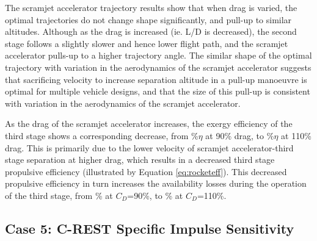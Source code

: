 The scramjet accelerator trajectory results show that when drag is varied, the optimal trajectories do not change shape significantly, and pull-up to similar altitudes. Although as the drag is increased (ie. L/D is decreased), the second stage follows a slightly slower and hence lower flight path, and the scramjet accelerator pulls-up to a higher trajectory angle. The similar shape of the optimal trajectory with variation in the aerodynamics of the scramjet accelerator suggests that sacrificing velocity to increase separation altitude in a pull-up manoeuvre is optimal for multiple vehicle designs, and that the size of this pull-up is consistent with variation in the aerodynamics of the scramjet accelerator. 

As the drag of the scramjet accelerator increases, the exergy efficiency of the third stage shows a corresponding decrease, from \thirddExergyEffCdNinetyNoReturn\%$\eta$ at 90\% drag, to \thirddExergyEffCdOneHundredTenNoReturn\%$\eta$ at 110\% drag.
This is primarily due to the lower velocity of scramjet accelerator-third stage separation at higher drag, which results in a decreased third stage propulsive efficiency (illustrated by Equation \ref{eq:rocketeff}). This decreased propulsive efficiency in turn increases the availability losses during the operation of the third stage, from \PlossthreeCdNinetyNoReturn\% at $C_D$=90\%, to \PlossthreeCdOneHundredTenNoReturn\% at $C_D$=110\%.


\subsection{Case 5: C-REST Specific Impulse Sensitivity}\label{sec:ispsensitivitynoflyback}

